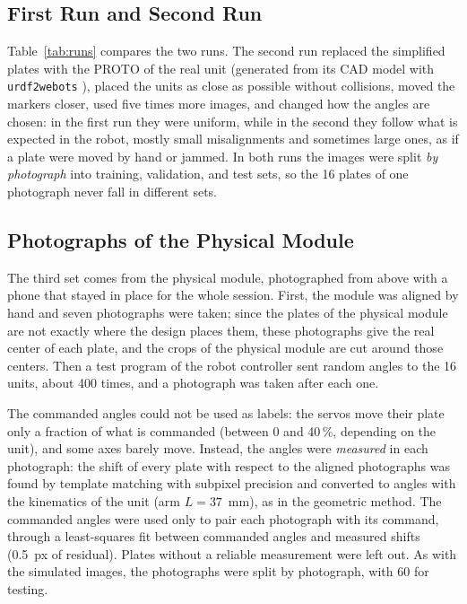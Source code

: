 \documentclass[lettersize,journal]{IEEEtran}
\begin{document}
	\subsection{First Run and Second Run}

	Table~\ref{tab:runs} compares the two runs. The second run replaced the simplified plates with the PROTO of the real unit (generated from its CAD model with \texttt{urdf2webots} \cite{urdf2webots}), placed the units as close as possible without collisions, moved the markers closer, used five times more images, and changed how the angles are chosen: in the first run they were uniform, while in the second they follow what is expected in the robot, mostly small misalignments and sometimes large ones, as if a plate were moved by hand or jammed. In both runs the images were split \emph{by photograph} into training, validation, and test sets, so the 16 plates of one photograph never fall in different sets.

 \subsection{Photographs of the Physical Module}
 \label{sec:real}

 The third set comes from the physical module, photographed from above with a phone that stayed in place for the whole session. First, the module was aligned by hand and seven photographs were taken; since the plates of the physical module are not exactly where the design places them, these photographs give the real center of each plate, and the crops of the physical module are cut around those centers. Then a test program of the robot controller sent random angles to the 16 units, about 400 times, and a photograph was taken after each one.

 The commanded angles could not be used as labels: the servos move their plate only a fraction of what is commanded (between 0 and 40\,\%, depending on the unit), and some axes barely move. Instead, the angles were \emph{measured} in each photograph: the shift of every plate with respect to the aligned photographs was found by template matching with subpixel precision and converted to angles with the kinematics of the unit (arm $L=37$~mm), as in the geometric method. The commanded angles were used only to pair each photograph with its command, through a least-squares fit between commanded angles and measured shifts (0.5~px of residual). Plates without a reliable measurement were left out. As with the simulated images, the photographs were split by photograph, with 60 for testing.
\end{document}
